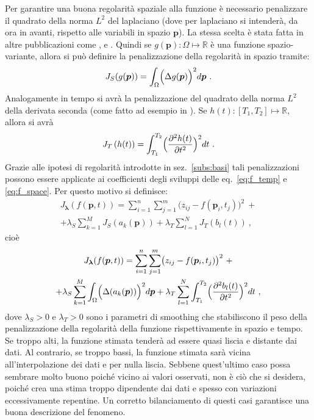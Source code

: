 \documentclass[a4paper,11pt,twoside,openright]{book}							%
\begin{document}
Per garantire una buona regolarità spaziale alla funzione è necessario penalizzare il quadrato della norma $L^2$ del laplaciano (dove per laplaciano si intenderà, da ora in avanti, rispetto alle variabili in spazio $\bm p$). La stessa scelta è stata fatta in altre pubblicazioni come \cite{art:ramsay}, \cite{art:sangalli} e \cite{art:wood}. Quindi se $g(\bm p): \Omega \mapsto \mathbb{R}$ è una funzione spazio-variante, allora si può definire la penalizzazione della regolarità in spazio tramite:
$$
J_S(g(\bm p))=\int_{\Omega} \Bigl( \Delta  g(\bm p  ) \Bigr)^2 d \bm p \ .
$$
Analogamente in tempo si avrà la penalizzazione del quadrato della norma $L^2$ della derivata seconda (come fatto ad esempio in \cite{art:ramsaysilverman}). Se $h(t): [T_1,T_2] \mapsto \mathbb{R}$, allora si avrà
$$
J_T\left(h(t)\right)=\int_{T_1}^{T_2} \Bigl( \frac{\partial^2   h(t)   }{\partial t ^2} \Bigr)^2 dt\ .
$$
Grazie alle ipotesi di regolarità introdotte in sez.~\ref{subs:basi} tali penalizzazioni possono essere applicate ai coefficienti degli sviluppi delle eq.~\ref{eq:f_temp} e \ref{eq:f_space}. Per questo motivo si definisce:
\begin{multline*}
J_{\bm \lambda }(f(\bm p,t))=\sum_{i=1}^n \sum_{j=1}^m \bigl( z_{ij} - f(\bm p_i,t_j) \bigr)^2 \ + \\
+\lambda_S  \sum_{k=1}^M J_S( a_k(\bm p)) + \lambda_T \sum_{l=1}^N J_T ( b_l(t)) \ ,
\end{multline*}
cioè
\begin{multline}
\label{eq:penalizzdisc}
J_{\bm \lambda }(f(\bm p,t))=\sum_{i=1}^n \sum_{j=1}^m \bigl( z_{ij} - f(\bm p_i,t_j) \bigr)^2 \ + \\
+\lambda_S  \sum_{k=1}^M \int_{\Omega} \Bigl( \Delta(  a_k(\bm p)  ) \Bigr)^2 d \bm p + \lambda_T \sum_{l=1}^N\int_{T_1}^{T_2} \Bigl( \frac{\partial^2   b_l(t)   }{\partial t ^2} \Bigr)^2 dt \ ,
\end{multline}
dove $\lambda_S>0$ e $\lambda_T>0$ sono i parametri di smoothing che stabiliscono il peso della penalizzazione della regolarità della funzione rispettivamente in spazio e tempo. Se troppo alti, la funzione stimata tenderà ad essere quasi liscia e distante dai dati. Al contrario, se troppo bassi, la funzione stimata sarà vicina all'interpolazione dei dati e per nulla liscia. Sebbene quest'ultimo caso possa sembrare molto buono poiché vicino ai valori osservati, non è ciò che si desidera, poiché crea una stima troppo dipendente dai dati e spesso con variazioni eccessivamente repentine. Un corretto bilanciamento di questi casi garantisce una buona descrizione del fenomeno.
\end{document}
